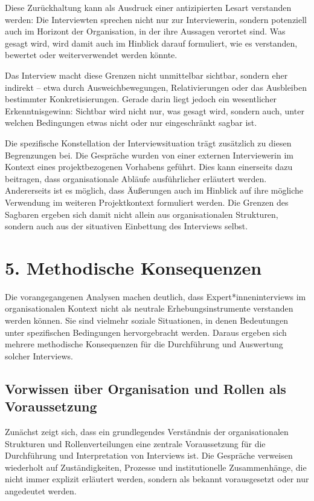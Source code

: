 \documentclass[a4paper,
fontsize=11pt,
oneside,
numbers=noperiodatend,
parskip=half-,
bibliography=totoc,
final
]{scrartcl}
\begin{document}
Diese Zurückhaltung kann als Ausdruck einer antizipierten Lesart
verstanden werden: Die Interviewten sprechen nicht nur zur
Interviewerin, sondern potenziell auch im Horizont der Organisation, in
der ihre Aussagen verortet sind. Was gesagt wird, wird damit auch im
Hinblick darauf formuliert, wie es verstanden, bewertet oder
weiterverwendet werden könnte.

Das Interview macht diese Grenzen nicht unmittelbar sichtbar, sondern
eher indirekt -- etwa durch Ausweichbewegungen, Relativierungen oder das
Ausbleiben bestimmter Konkretisierungen. Gerade darin liegt jedoch ein
wesentlicher Erkenntnisgewinn: Sichtbar wird nicht nur, was gesagt wird,
sondern auch, unter welchen Bedingungen etwas nicht oder nur
eingeschränkt sagbar ist.

Die spezifische Konstellation der Interviewsituation trägt zusätzlich zu
diesen Begrenzungen bei. Die Gespräche wurden von einer externen
Interviewerin im Kontext eines projektbezogenen Vorhabens geführt. Dies
kann einerseits dazu beitragen, dass organisationale Abläufe
ausführlicher erläutert werden. Andererseits ist es möglich, dass
Äußerungen auch im Hinblick auf ihre mögliche Verwendung im weiteren
Projektkontext formuliert werden. Die Grenzen des Sagbaren ergeben sich
damit nicht allein aus organisationalen Strukturen, sondern auch aus der
situativen Einbettung des Interviews selbst.

\section{5. Methodische
Konsequenzen}\label{methodische-konsequenzen}

Die vorangegangenen Analysen machen deutlich, dass
Expert*inneninterviews im organisationalen Kontext nicht als neutrale
Erhebungsinstrumente verstanden werden können. Sie sind vielmehr soziale
Situationen, in denen Bedeutungen unter spezifischen Bedingungen
hervorgebracht werden. Daraus ergeben sich mehrere methodische
Konsequenzen für die Durchführung und Auswertung solcher Interviews.

\subsection{Vorwissen über Organisation und Rollen als
Voraussetzung}\label{vorwissen-uxfcber-organisation-und-rollen-als-voraussetzung}

Zunächst zeigt sich, dass ein grundlegendes Verständnis der
organisationalen Strukturen und Rollenverteilungen eine zentrale
Voraussetzung für die Durchführung und Interpretation von Interviews
ist. Die Gespräche verweisen wiederholt auf Zuständigkeiten, Prozesse
und institutionelle Zusammenhänge, die nicht immer explizit erläutert
werden, sondern als bekannt vorausgesetzt oder nur angedeutet werden.
\end{document}
